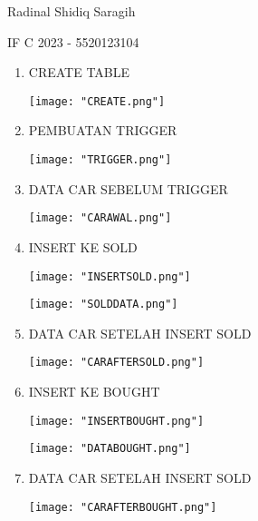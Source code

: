 \documentclass[12pt,a4paper]{article}
\date{}
\begin{document}
Radinal Shidiq Saragih

IF C 2023 - 5520123104


\begin{enumerate}


  \item CREATE TABLE

  \begin{center}
    \texttt{[image: "CREATE.png"]}
  \end{center}

  \item PEMBUATAN TRIGGER

  \begin{center}
    \texttt{[image: "TRIGGER.png"]}
  \end{center}

  \item DATA CAR SEBELUM TRIGGER

  \begin{center}
    \texttt{[image: "CARAWAL.png"]}
  \end{center}

  \item INSERT KE SOLD

  \begin{center}
    \texttt{[image: "INSERTSOLD.png"]}
  \end{center}

  \begin{center}
    \texttt{[image: "SOLDDATA.png"]}
  \end{center}

  \item DATA CAR SETELAH INSERT SOLD

  \begin{center}
    \texttt{[image: "CARAFTERSOLD.png"]}
  \end{center}

  \item INSERT KE BOUGHT

  \begin{center}
    \texttt{[image: "INSERTBOUGHT.png"]}
  \end{center}

  \begin{center}
    \texttt{[image: "DATABOUGHT.png"]}
  \end{center}

  \item DATA CAR SETELAH INSERT SOLD

  \begin{center}
    \texttt{[image: "CARAFTERBOUGHT.png"]}
  \end{center}


\end{enumerate}
\end{document}
